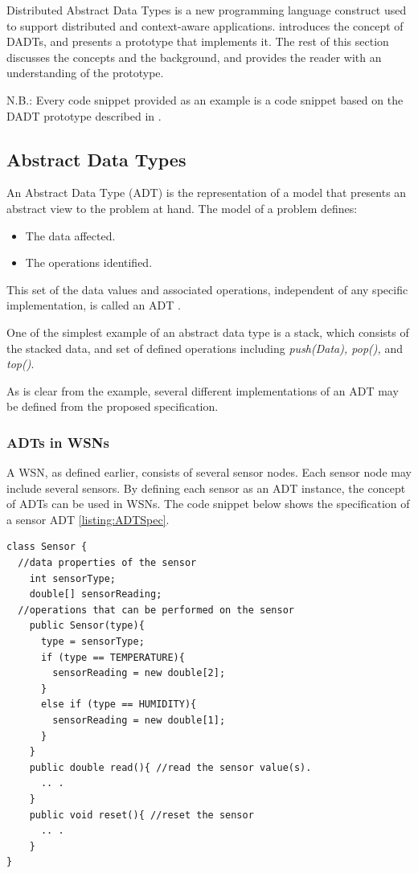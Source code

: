 Distributed Abstract Data Types is a new programming language construct used to
support distributed and context-aware applications. \cite{migliavacca_DADT:2006}
introduces the concept of DADTs, and presents a prototype that implements it.
The rest of this section discusses the concepts and the background, and
provides the reader with an understanding of the prototype.

N.B.: Every code snippet provided as an example is a code snippet based on the
DADT prototype described in \cite{migliavacca_DADT:2006}.

\subsection{Abstract Data Types}
An Abstract Data Type (ADT) is the representation of a model that presents an
abstract view to the problem at hand. The model of a problem defines:

\begin{itemize}
  \item The data affected.
  \item The operations identified.
\end{itemize}

This set of the data values and associated operations, independent of any
specific implementation, is called an ADT \cite{ADDREF_NIST}. 

One of the simplest example of an abstract data type is a stack, which
consists of the stacked data, and set of defined operations including \emph{push(Data), pop(),}
and \emph{top()}.

As is clear from the example, several different implementations of an ADT may
be defined from the proposed specification.

\subsubsection{ADTs in WSNs} \label{subsubsec:ADTsinWSN}

A WSN, as defined earlier, consists of several sensor nodes. Each sensor node
may include several sensors. By defining each sensor as
an ADT instance, the concept of ADTs can be used in WSNs. The code snippet below
shows the specification of a sensor ADT \ref{listing:ADTSpec}.   
  
\lstset{language = Java}  
 \begin{lstlisting}[frame=trbl, basewidth={0.55em, 0.6em}, captionpos=b, basicstyle=\ttfamily\footnotesize, breaklines, caption = Sensor ADT specification (reproduced from \cite{migliavacca_DADT:2006}), label = listing:ADTSpec ]
class Sensor {
  //data properties of the sensor 
    int sensorType;
    double[] sensorReading;
  //operations that can be performed on the sensor  
	public Sensor(type){
	  type = sensorType;
	  if (type == TEMPERATURE){
		sensorReading = new double[2];
	  }
	  else if (type == HUMIDITY){
		sensorReading = new double[1];
	  }
	}
    public double read(){ //read the sensor value(s).
	  .. .
	} 
	public void reset(){ //reset the sensor
	  .. .
	}
}
\end{lstlisting}

